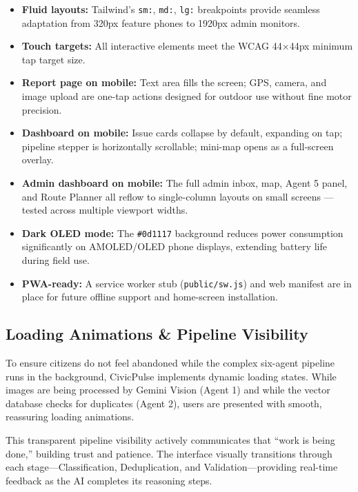 \documentclass[11pt,a4paper]{article}
\newcommand{\tech}[1]{\texttt{\color{cpteal}#1}}
\newcommand{\file}[1]{\texttt{\footnotesize\color{cpgray}#1}}
\begin{document}
\begin{itemize}
  \item \textbf{Fluid layouts:} Tailwind's \tech{sm:}, \tech{md:}, \tech{lg:} breakpoints provide seamless adaptation from 320px feature phones to 1920px admin monitors.
  \item \textbf{Touch targets:} All interactive elements meet the WCAG 44×44px minimum tap target size.
  \item \textbf{Report page on mobile:} Text area fills the screen; GPS, camera, and image upload are one-tap actions designed for outdoor use without fine motor precision.
  \item \textbf{Dashboard on mobile:} Issue cards collapse by default, expanding on tap; pipeline stepper is horizontally scrollable; mini-map opens as a full-screen overlay.
  \item \textbf{Admin dashboard on mobile:} The full admin inbox, map, Agent 5 panel, and Route Planner all reflow to single-column layouts on small screens — tested across multiple viewport widths.
  \item \textbf{Dark OLED mode:} The \tech{\#0d1117} background reduces power consumption significantly on AMOLED/OLED phone displays, extending battery life during field use.
  \item \textbf{PWA-ready:} A service worker stub (\file{public/sw.js}) and web manifest are in place for future offline support and home-screen installation.
\end{itemize}

\subsection{Loading Animations \& Pipeline Visibility}
To ensure citizens do not feel abandoned while the complex six-agent pipeline runs in the background, CivicPulse implements dynamic loading states. While images are being processed by Gemini Vision (Agent 1) and while the vector database checks for duplicates (Agent 2), users are presented with smooth, reassuring loading animations. 

This transparent pipeline visibility actively communicates that ``work is being done,'' building trust and patience. The interface visually transitions through each stage—Classification, Deduplication, and Validation—providing real-time feedback as the AI completes its reasoning steps.
\end{document}
